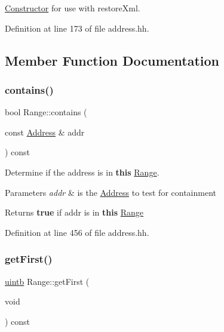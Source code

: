 \mbox{\hyperlink{class_constructor}{Constructor}} for use with restore\+Xml. 



Definition at line 173 of file address.\+hh.



\subsection{Member Function Documentation}
\mbox{\label{class_range_a88b49f65bc500d33d15941f053db4e11}} 
\subsubsection{\texorpdfstring{contains()}{contains()}}
{\footnotesize\ttfamily bool Range\+::contains (\begin{DoxyParamCaption}\item[{const \mbox{\hyperlink{class_address}{Address}} \&}]{addr }\end{DoxyParamCaption}) const\hspace{0.3cm}{\ttfamily [inline]}}



Determine if the address is in {\bfseries{this}} \mbox{\hyperlink{class_range}{Range}}. 


\begin{DoxyParams}{Parameters}
{\em addr} & is the \mbox{\hyperlink{class_address}{Address}} to test for containment \\
\hline
\end{DoxyParams}
\begin{DoxyReturn}{Returns}
{\bfseries{true}} if addr is in {\bfseries{this}} \mbox{\hyperlink{class_range}{Range}} 
\end{DoxyReturn}


Definition at line 456 of file address.\+hh.

\mbox{\label{class_range_a40c5034428ad9d55e1c4fd4429d3ab45}} 
\subsubsection{\texorpdfstring{getFirst()}{getFirst()}}
{\footnotesize\ttfamily \mbox{\hyperlink{types_8h_a2db313c5d32a12b01d26ac9b3bca178f}{uintb}} Range\+::get\+First (\begin{DoxyParamCaption}\item[{void}]{ }\end{DoxyParamCaption}) const\hspace{0.3cm}{\ttfamily [inline]}}



